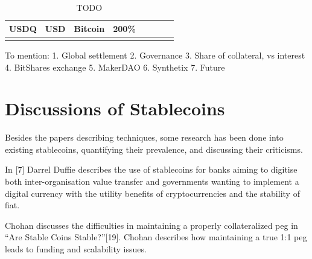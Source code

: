 \documentclass[english,]{IEEEtran}
\begin{document}
\begin{table}[t]
\begin{center}
\begin{supertabular}[]{@{}llllllll@{}}
\begin{minipage}[t]{0.09\textwidth}\raggedright
USDQ\strut
\end{minipage} & \begin{minipage}[t]{0.04\textwidth}\raggedright
USD\strut
\end{minipage} & \begin{minipage}[t]{0.13\textwidth}\raggedright
Bitcoin\strut
\end{minipage} & \begin{minipage}[t]{0.06\textwidth}\raggedright
200\%\strut
\end{minipage} & \begin{minipage}[t]{0.21\textwidth}\raggedright
\strut
\end{minipage} & \begin{minipage}[t]{0.11\textwidth}\raggedright
\strut
\end{minipage} & \begin{minipage}[t]{0.09\textwidth}\raggedright
\strut
\end{minipage} & \begin{minipage}[t]{0.06\textwidth}\raggedright
\strut
\end{minipage}\tabularnewline
\bottomrule
\tabularnewline
\end{supertabular}
\caption{TODO \label{TODO}}
\end{center}\end{table}

To mention: 1. Global settlement 2. Governance 3. Share of collateral,
vs interest 4. BitShares exchange 5. MakerDAO 6. Synthetix 7. Future

\hypertarget{discussions-of-stablecoins}{%
\section{Discussions of Stablecoins}\label{discussions-of-stablecoins}}

Besides the papers describing techniques, some research has been done
into existing stablecoins, quantifying their prevalence, and discussing
their criticisms.

In {[}7{]} Darrel Duffie describes the use of stablecoins for banks
aiming to digitise both inter-organisation value transfer and
governments wanting to implement a digital currency with the utility
benefits of cryptocurrencies and the stability of fiat.

Chohan discusses the difficulties in maintaining a properly
collateralized peg in ``Are Stable Coins Stable?''{[}19{]}. Chohan
describes how maintaining a true 1:1 peg leads to funding and
scalability issues.
\end{document}
